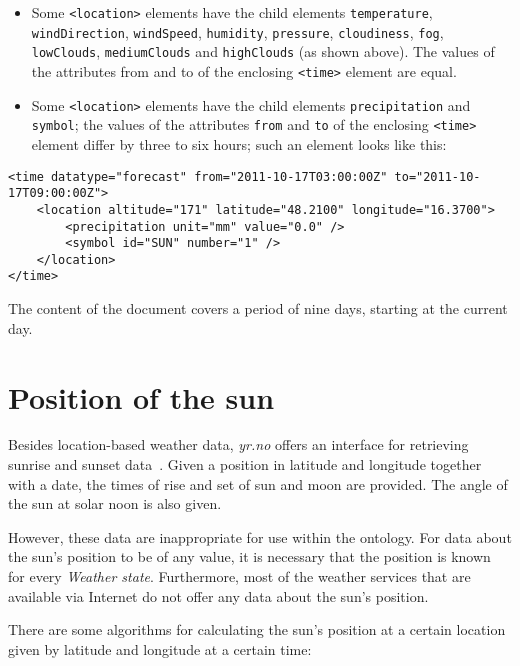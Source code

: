 \begin{itemize}
  \item Some \texttt{<location>} elements have the child elements \texttt{temperature}, \texttt{windDirection}, \texttt{windSpeed}, \texttt{humidity}, \texttt{pressure}, \texttt{cloudiness}, \texttt{fog}, \texttt{lowClouds}, \texttt{mediumClouds} and \texttt{highClouds} (as shown above). The values of the attributes from and to of the enclosing \texttt{<time>} element are equal.
  \item Some \texttt{<location>} elements have the child elements \texttt{precipitation} and \texttt{symbol}; the values of the attributes \texttt{from} and \texttt{to} of the enclosing \texttt{<time>} element differ by three to six hours; such an element looks like this:
\end{itemize}

\begin{lstlisting}
<time datatype="forecast" from="2011-10-17T03:00:00Z" to="2011-10-17T09:00:00Z">
	<location altitude="171" latitude="48.2100" longitude="16.3700">
		<precipitation unit="mm" value="0.0" />
		<symbol id="SUN" number="1" />
	</location>
</time>
\end{lstlisting}

The content of the  document covers a period of nine days, starting at the current day.

\section{Position of the sun}
\label{sec:sun_position}

Besides location-based weather data, \emph{yr.no} offers an interface for retrieving sunrise and sunset data~\cite{yrno_sunrise}. Given a position in latitude and longitude together with a date, the times of rise and set of sun and moon are provided. The angle of the sun at solar noon is also given.

However, these data are inappropriate for use within the \thinkhomeweather ontology. For data about the sun's position to be of any value, it is necessary that the position is known for every \emph{Weather state}. Furthermore, most of the weather services that are available via Internet do not offer any data about the sun's position.

There are some algorithms for calculating the sun's position at a certain location given by latitude and longitude at a certain time:

